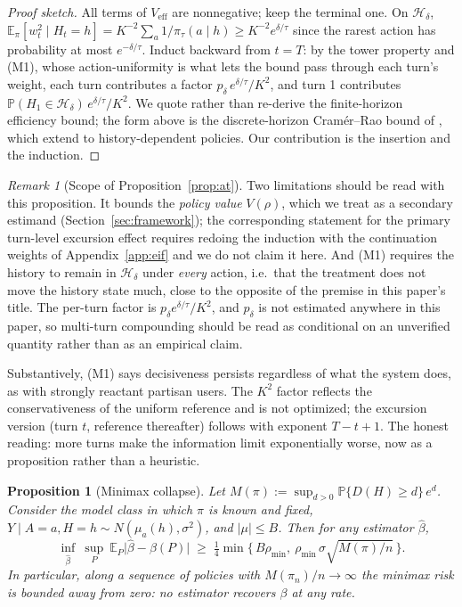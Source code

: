 \documentclass[11pt]{article}
\newtheorem{proposition}{Proposition}
\theoremstyle{definition}
\theoremstyle{remark}
\newtheorem{remark}{Remark}
\newcommand{\E}{\mathbb{E}}
\newcommand{\Prob}{\mathbb{P}}
\newcommand{\Hd}{\mathcal{H}_{\delta}}
\begin{document}
\begin{proof}[Proof sketch]
All terms of $V_{\mathrm{eff}}$ are nonnegative; keep the terminal one. On
$\Hd$, $\E_\pi[w_t^2 \mid H_t = h] = K^{-2}\sum_a 1/\pi_\tau(a \mid h) \geq
K^{-2} e^{\delta/\tau}$ since the rarest action has probability at most
$e^{-\delta/\tau}$. Induct backward from $t = T$: by the tower property and
(M1), whose action-uniformity is what lets the bound pass through each
turn's weight, each turn contributes a factor $p_\delta\,
e^{\delta/\tau}/K^{2}$, and turn 1 contributes $\Prob(H_1 \in \Hd)\,
e^{\delta/\tau}/K^{2}$. We quote rather than re-derive the finite-horizon
efficiency bound; the form above is the discrete-horizon Cram\'er--Rao bound
of \citet{jiang2016doubly}, which \citet{kallus2020double} extend to
history-dependent policies. Our contribution is the insertion and the
induction.
\end{proof}

\begin{remark}[Scope of Proposition~\ref{prop:at}]\label{rem:atscope}
Two limitations should be read with this proposition. It bounds the
\emph{policy value} $V(\rho)$, which we treat as a secondary estimand
(Section~\ref{sec:framework}); the corresponding statement for the primary
turn-level excursion effect requires redoing the induction with the
continuation weights of Appendix~\ref{app:eif} and we do not claim it here.
And (M1) requires the history to remain in $\Hd$ under \emph{every} action,
i.e.\ that the treatment does not move the history state much, close to
the opposite of the premise in this paper's title. The per-turn factor is
$p_\delta e^{\delta/\tau}/K^2$, and $p_\delta$ is not estimated anywhere in
this paper, so multi-turn compounding should be read as conditional on an
unverified quantity rather than as an empirical claim.
\end{remark}

Substantively, (M1) says decisiveness persists regardless of what the system
does, as with strongly reactant partisan users. The $K^2$ factor reflects
the conservativeness of the uniform reference and is not optimized; the
excursion version (turn $t$, reference thereafter) follows with exponent
$T-t+1$. The honest reading: more turns make the information limit
exponentially worse, now as a proposition rather than a heuristic.

\begin{proposition}[Minimax collapse]\label{prop:minimax}
Let $M(\pi) := \sup_{d>0} \Prob\{D(H) \geq d\}\,e^{d}$. Consider the model
class in which $\pi$ is known and fixed, $Y \mid A=a, H=h \sim
N(\mu_a(h), \sigma^2)$, and $|\mu| \leq B$. Then for any estimator
$\hat\beta$,
\[
\inf_{\hat\beta}\ \sup_{P}\ \E_P\big|\hat\beta - \beta(P)\big|
\;\geq\; \tfrac14 \min\Big\{\, B\rho_{\min},\ \rho_{\min}\,\sigma
\sqrt{M(\pi)/n} \,\Big\}.
\]
In particular, along a sequence of policies with $M(\pi_n)/n \to \infty$
the minimax risk is bounded away from zero: no estimator recovers $\beta$
at any rate.
\end{proposition}
\end{document}
